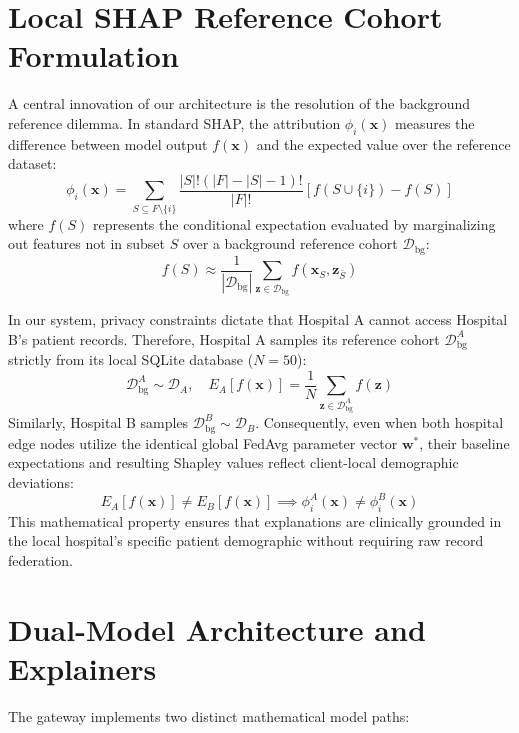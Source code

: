 \documentclass[12pt,a4paper,oneside]{report}
\begin{document}
\section{Local SHAP Reference Cohort Formulation}
A central innovation of our architecture is the resolution of the background reference dilemma. In standard SHAP, the attribution $\phi_i(\mathbf{x})$ measures the difference between model output $f(\mathbf{x})$ and the expected value over the reference dataset:
\begin{equation}
    \phi_i(\mathbf{x}) = \sum_{S \subseteq F \setminus \{i\}} \frac{|S|! (|F| - |S| - 1)!}{|F|!} \left[ f(S \cup \{i\}) - f(S) \right]
    \label{eq:shap_formula}
\end{equation}
where $f(S)$ represents the conditional expectation evaluated by marginalizing out features not in subset $S$ over a background reference cohort $\mathcal{D}_{\text{bg}}$:
\begin{equation}
    f(S) \approx \frac{1}{|\mathcal{D}_{\text{bg}}|} \sum_{\mathbf{z} \in \mathcal{D}_{\text{bg}}} f(\mathbf{x}_S, \mathbf{z}_{\bar{S}})
\end{equation}

In our system, privacy constraints dictate that Hospital A cannot access Hospital B's patient records. Therefore, Hospital A samples its reference cohort $\mathcal{D}_{\text{bg}}^A$ strictly from its local SQLite database ($N=50$):
\begin{equation}
    \mathcal{D}_{\text{bg}}^A \sim \mathcal{D}_A, \quad E_A[f(\mathbf{x})] = \frac{1}{N} \sum_{\mathbf{z} \in \mathcal{D}_{\text{bg}}^A} f(\mathbf{z})
\end{equation}
Similarly, Hospital B samples $\mathcal{D}_{\text{bg}}^B \sim \mathcal{D}_B$. Consequently, even when both hospital edge nodes utilize the identical global FedAvg parameter vector $\mathbf{w}^*$, their baseline expectations and resulting Shapley values reflect client-local demographic deviations:
\begin{equation}
    E_A[f(\mathbf{x})] \neq E_B[f(\mathbf{x})] \implies \phi_i^A(\mathbf{x}) \neq \phi_i^B(\mathbf{x})
\end{equation}
This mathematical property ensures that explanations are clinically grounded in the local hospital's specific patient demographic without requiring raw record federation.

\section{Dual-Model Architecture and Explainers}
The gateway implements two distinct mathematical model paths:
\end{document}
